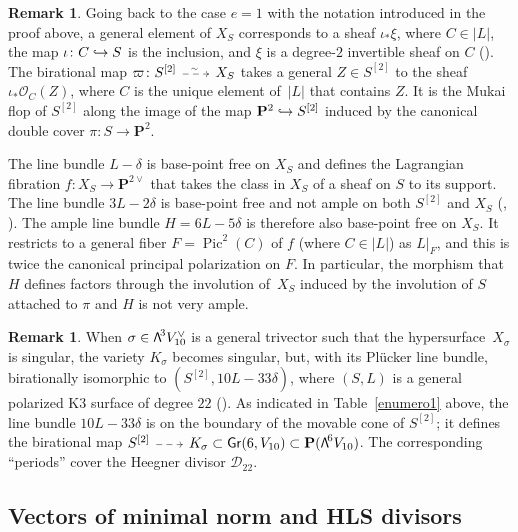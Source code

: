 \documentclass[11pt]{article}
\makeatletter
\let\mathcal\mathscr
\newcommand\hto{\mathrel{\lhook\joinrel\to}}
\newcommand{\dradpl}{{\!\!\xymatrix@C=8mm{\ar@{-->}[r]&}\!\!}}
\newcommand{\dratst}{{\,\mathrel{\scalebox{.8}{$\dradpl$}}\,}}
\newcommand{\drascst}{{\,\mathrel{\scalebox{.6}{$\dradpl$}}\,}}
\newcommand{\dra}{\mathchoice{\dradpl}{\dratst}{\drascst}{\drascst}}
\newcommand{\isomdra}{\overset{_\sim\,}{\dra}}
\theoremstyle{definition}
\newtheorem{rema}[lemm]{Remark}
\renewcommand\P{{\mathbf P}}\let\PP\P
\newcommand\cD{\mathcal{D}}
\newcommand\cO{\mathcal{O}}\let\OO\cO
\DeclareMathOperator{\Gr}{\mathsf{Gr}}
\let\Ld L
\DeclareMathOperator{\Pic}{Pic}
\newcommand\bw[1]{{\hbox{\large$\mathsf{\Lambda}$}^{\!#1}}}
\newcommand\hilbS{S^{[2]}}
\renewcommand{\dratst}{\mathrel{\scalebox{.8}{$\dradpl$}}}
\renewcommand{\drascst}{\mathrel{\scalebox{.6}{$\dradpl$}}}
\makeatother
\begin{document}
\begin{rema}\upshape\label{rema33}
Going back to the case $e=1$ with the notation introduced in the proof above, a
general element of $X_S$
corresponds to a sheaf $\iota_{*}\xi$, where $C\in |L|$, the map $\iota\colon C\hto S$ is the inclusion, and $\xi$ is a degree-$2$ invertible sheaf on $C$ (\cite[Ex.\,0.6]{muk0}).
The birational map $
\varpi\colon
\hilbS\isomdra X_S$ takes a general $Z\in \hilbS$ to the sheaf $\iota_{*}\cO_C(Z)$, where $C$ is the unique element of~$|L|$ that contains $Z$. It is
the Mukai flop of $\hilbS $ along the image of the map $\P^2\hto \hilbS$ induced by the canonical double cover $\pi\colon S\to \P^2$.

The line bundle $L-\delta$ is base-point free on $X_S$ and defines the Lagrangian fibration \mbox{$f\colon X_S\to \P^{2\vee}$} that takes the class in $X_S$ of a sheaf on $S$ to its support.
The line bundle $3\Ld-2\delta$ is base-point free and not ample on both $\hilbS$ and $X_S$
(\cite[Exer.\,3.13]{survey}, \cite[Lem.\,2.1.12]{vdd}). The ample line bundle $H=6L-5\delta$ is therefore also base-point free on $X_S$. It restricts to a general fiber $F=\Pic^2(C)$ of $f$ (where $C\in |L|$) as $L\vert_F$, and this is twice the canonical principal polarization on $F$. In particular, the morphism that $H$ defines factors through the involution of~$X_S$ induced by the involution of $S$ attached to $\pi$ and $H$ is not very ample.
\end{rema}

\begin{rema}\label{rema36}
When $\sigma\in \bw3V_{10}^\vee$ is a general trivector such that the hypersurface~$X_\sigma$ is singular, the variety $K_\sigma$ becomes singular, but, with its Plücker line bundle, birationally isomorphic to $(\hilbS, 10\Ld-33\delta)$, where $(S,L)$ is a general polarized K3 surface of degree $22$ (\cite[Prop.\,3.4]{devo}). As indicated in Table~\ref{enumero1} above, the line bundle $10\Ld-33\delta$ is on the boundary of the movable cone of $\hilbS$; it defines the birational map $\hilbS\dra K_\sigma \subset \Gr(6,V_{10})\subset \P(\bw6V_{10})$. The corresponding ``periods'' cover the Heegner divisor $ \cD_{22}$.
\end{rema}

\subsection{Vectors of minimal norm and HLS divisors}\label{section35}
\end{document}
